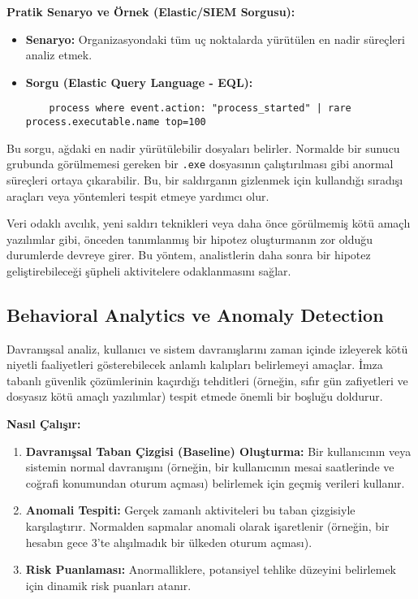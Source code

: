 \textbf{Pratik Senaryo ve Örnek (Elastic/SIEM Sorgusu):}

\begin{itemize}
    \item \textbf{Senaryo:} Organizasyondaki tüm uç noktalarda yürütülen en nadir süreçleri analiz etmek.
    \item \textbf{Sorgu (Elastic Query Language - EQL):}
    \begin{verbatim}
    process where event.action: "process_started" | rare process.executable.name top=100
    \end{verbatim}
\end{itemize}

Bu sorgu, ağdaki en nadir yürütülebilir dosyaları belirler. Normalde bir sunucu grubunda görülmemesi gereken bir \texttt{.exe} dosyasının çalıştırılması gibi anormal süreçleri ortaya çıkarabilir. Bu, bir saldırganın gizlenmek için kullandığı sıradışı araçları veya yöntemleri tespit etmeye yardımcı olur.

Veri odaklı avcılık, yeni saldırı teknikleri veya daha önce görülmemiş kötü amaçlı yazılımlar gibi, önceden tanımlanmış bir hipotez oluşturmanın zor olduğu durumlerde devreye girer. Bu yöntem, analistlerin daha sonra bir hipotez geliştirebileceği şüpheli aktivitelere odaklanmasını sağlar.

\subsection{Behavioral Analytics ve Anomaly Detection}

Davranışsal analiz, kullanıcı ve sistem davranışlarını zaman içinde izleyerek kötü niyetli faaliyetleri gösterebilecek anlamlı kalıpları belirlemeyi amaçlar. İmza tabanlı güvenlik çözümlerinin kaçırdığı tehditleri (örneğin, sıfır gün zafiyetleri ve dosyasız kötü amaçlı yazılımlar) tespit etmede önemli bir boşluğu doldurur.

\textbf{Nasıl Çalışır:}

\begin{enumerate}
    \item \textbf{Davranışsal Taban Çizgisi (Baseline) Oluşturma:} Bir kullanıcının veya sistemin normal davranışını (örneğin, bir kullanıcının mesai saatlerinde ve coğrafi konumundan oturum açması) belirlemek için geçmiş verileri kullanır.
    \item \textbf{Anomali Tespiti:} Gerçek zamanlı aktiviteleri bu taban çizgisiyle karşılaştırır. Normalden sapmalar anomali olarak işaretlenir (örneğin, bir hesabın gece 3'te alışılmadık bir ülkeden oturum açması).
    \item \textbf{Risk Puanlaması:} Anormalliklere, potansiyel tehlike düzeyini belirlemek için dinamik risk puanları atanır.
\end{enumerate}

